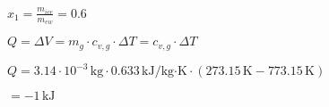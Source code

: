 \( x_1 = \frac{m_{ice}}{m_{ew}} = 0.6 \)  

\( Q = \Delta V = m_g \cdot c_{v,g} \cdot \Delta T = c_{v,g} \cdot \Delta T \)  

\( Q = 3.14 \cdot 10^{-3} \, \text{kg} \cdot 0.633 \, \text{kJ/kg·K} \cdot (273.15 \, \text{K} - 773.15 \, \text{K}) \)  

\( = -1 \, \text{kJ} \)